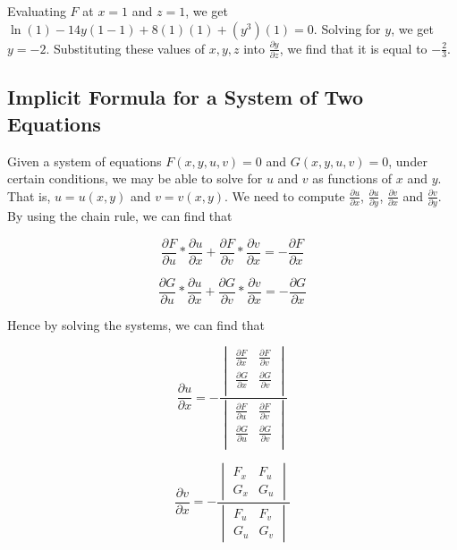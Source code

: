 \documentclass[11pt]{article}
\theoremstyle{plain} %
\theoremstyle{definition}
\theoremstyle{example}
\theoremstyle{remark}
\begin{document}
Evaluating $F$ at $x=1$ and $z=1$, we get $\ln(1) -14y(1-1)+8(1)(1)+(y^3)(1) = 0$. Solving for $y$, we get $y=-2$. Substituting these values of $x,y,z$ into $\frac{\partial y}{\partial z}$, we find that it is equal to $-\frac{2}{3}$.

\subsection{Implicit Formula for a System of Two Equations}

Given a system of equations $F(x,y,u,v)=0$ and $G(x, y, u, v)=0$, under certain conditions, we may be able to solve for $u$ and $v$ as functions of $x$ and $y$. That is, $u=u(x,y)$ and $v=v(x,y)$. We need to compute $\frac{\partial u}{\partial x}$, $\frac{\partial u}{\partial y}$, $\frac{\partial v}{\partial x}$ and $\frac{\partial v}{\partial y}$. By using the chain rule, we can find that 

$$\frac{\partial F}{\partial u}*\frac{\partial u}{\partial x}+\frac{\partial F}{\partial v}*\frac{\partial v}{\partial x} = - \frac{\partial F}{\partial x}$$

$$\frac{\partial G}{\partial u}*\frac{\partial u}{\partial x}+\frac{\partial G}{\partial v}*\frac{\partial v}{\partial x} = - \frac{\partial G}{\partial x}$$

Hence by solving the systems, we can find that 

$$\frac{\partial u}{\partial x} = -
	\frac{\begin{vmatrix}
		\frac{\partial F}{\partial x} & \frac{\partial F}{\partial v}\\
		\frac{\partial G}{\partial x} & \frac{\partial G}{\partial v}\\
	\end{vmatrix}}{
	\begin{vmatrix}
		\frac{\partial F}{\partial u} & \frac{\partial F}{\partial v}\\
		\frac{\partial G}{\partial u} & \frac{\partial G}{\partial v}\\
	\end{vmatrix}}
	$$
	
	$$\frac{\partial v}{\partial x} = -
	\frac{\begin{vmatrix}
		F_x & F_u\\
		G_x & G_u
		\end{vmatrix}}{
	\begin{vmatrix}
		F_u & F_v\\
		G_u & G_v
		\end{vmatrix}}
	$$
	
\end{document}
